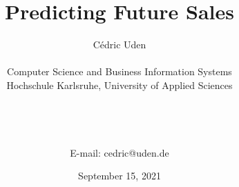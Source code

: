 
\title{Predicting Future Sales}



\author
{Cédric Uden\\
\\
\normalsize{Computer Science and Business Information Systems}\\
\normalsize{Hochschule Karlsruhe, University of Applied Sciences}\\
\\
\\

\\
\\
\normalsize{E-mail: cedric@uden.de}}


\date{\normalsize{September 15, 2021}}
